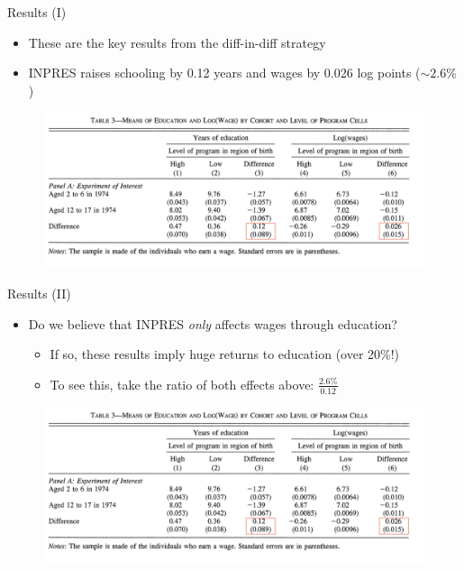 \documentclass[11pt,notes=hide,aspectratio=169,mathserif]{beamer}
\begin{document}
\begin{frame}{Results (I)}
\begin{itemize}
    \item These are the key results from the diff-in-diff strategy
    \item  INPRES raises schooling by 0.12 years and wages by 0.026 log points ($\sim 2.6\%$)
\end{itemize}
\begin{figure}
    \centering
    \includegraphics[width=\textwidth]{inputs/Table3a.png}
\end{figure}
\end{frame}

\begin{frame}{Results (II)}
\begin{itemize}
    \item Do we believe that INPRES \textit{only} affects wages through education?
    \begin{itemize}
        \item  If so, these results imply huge returns to education (over 20\%!)
        \item  To see this, take the ratio of both effects above: $\frac{2.6\%}{0.12}$
    \end{itemize}
\end{itemize}
\begin{figure}
    \centering
    \includegraphics[width=\textwidth]{inputs/Table3a.png}
\end{figure}
\end{frame}
\end{document}
